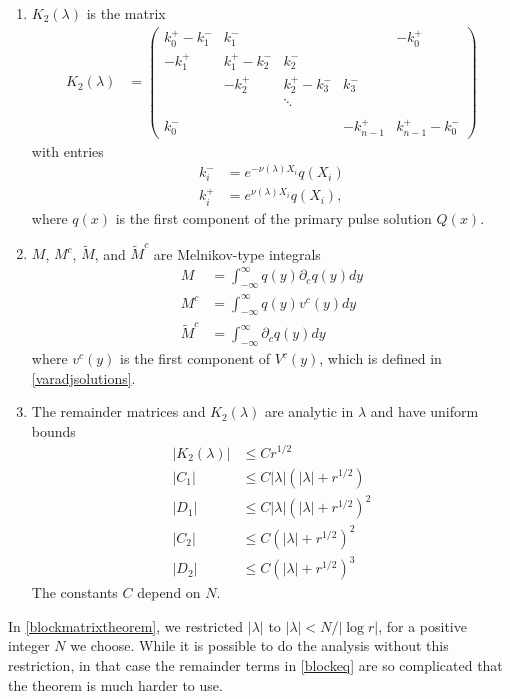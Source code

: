 \documentclass[thesis.tex]{subfiles}
\begin{document}
\begin{theorem}
\begin{enumerate}
\item $K_2(\lambda)$ is the matrix
\begin{align*}
K_2(\lambda) &= \begin{pmatrix}
k_0^+ - k_1^- & k_1^- &&& -k_0^+ \\
-k_1^+ & k_1^+ - k_2^- & k_2^- \\
& -k_2^+ & k_2^+ - k_3^- & k_3^- \\ && \ddots \\
\\
k_0^- &&& -k_{n-1}^+ & k_{n-1}^+ - k_0^- 
\end{pmatrix}
\end{align*}
with entries
\begin{align*}
k_i^- &= e^{-\nu(\lambda)X_i} q(X_i)\\
k_i^+ &= e^{\nu(\lambda)X_i} q(X_i),
\end{align*}
where $q(x)$ is the first component of the primary pulse solution $Q(x)$. 

\item $M$, $M^c$, $\tilde{M}$, and $\tilde{M}^c$ are  Melnikov-type integrals
\begin{align*}
M &= \int_{-\infty}^\infty q(y) \partial_c q(y) dy \\
M^c &= \int_{-\infty}^\infty q(y) v^c(y) dy \\
\tilde{M}^c &= \int_{-\infty}^\infty \partial_c q(y) dy
\end{align*}
where $v^c(y)$ is the first component of $V^c(y)$, which is defined in \cref{varadjsolutions}.

\item The remainder matrices and $K_2(\lambda)$ are analytic in $\lambda$ and have uniform bounds
\begin{align*}
|K_2(\lambda)| &\leq C r^{1/2} \\
|C_1| &\leq C |\lambda|(|\lambda| + r^{1/2}) \\
|D_1| &\leq C |\lambda|(|\lambda| + r^{1/2})^2 \\
|C_2| &\leq C (|\lambda| + r^{1/2})^2 \\
|D_2| &\leq C (|\lambda| + r^{1/2})^3 
\end{align*}
The constants $C$ depend on $N$.
\end{enumerate}
\end{theorem}

\begin{remark}
In \cref{blockmatrixtheorem}, we restricted $|\lambda|$ to $|\lambda| < N/|\log r|$, for a positive integer $N$ we choose. While it is possible to do the analysis without this restriction, in that case the remainder terms in \cref{blockeq} are so complicated that the theorem is much harder to use.
\end{remark}
\end{document}
